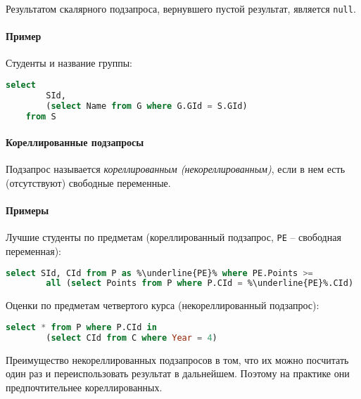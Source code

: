 \begin{remark}
	Результатом скалярного подзапроса, вернувшего пустой результат, является \texttt{null}.
\end{remark}

\paragraph{Пример}

Студенты и название группы:

\begin{lstlisting}[language=SQL]
    select
        SId,
        (select Name from G where G.GId = S.GId)
    from S
\end{lstlisting}

\paragraph{Кореллированные подзапросы}

\begin{definition}
	Подзапрос называется \textit{кореллированным (некореллированным)}, если в нем есть (отсутствуют) свободные переменные.
\end{definition}

\paragraph{Примеры}

Лучшие студенты по предметам (кореллированный подзапрос, \texttt{PE} -- свободная
переменная):

\begin{lstlisting}[language=SQL, escapechar=\%]
    select SId, CId from P as %\underline{PE}% where PE.Points >=
        all (select Points from P where P.CId = %\underline{PE}%.CId)
\end{lstlisting}

Оценки по предметам четвертого курса (некореллированный подзапрос):

\begin{lstlisting}[language=SQL]
    select * from P where P.CId in
        (select CId from C where Year = 4)
\end{lstlisting}

\begin{remark}
	Преимущество некореллированных подзапросов в том, что их можно посчитать один раз и
	переиспользовать результат в дальнейшем. Поэтому на практике они предпочтительнее кореллированных.
\end{remark}

